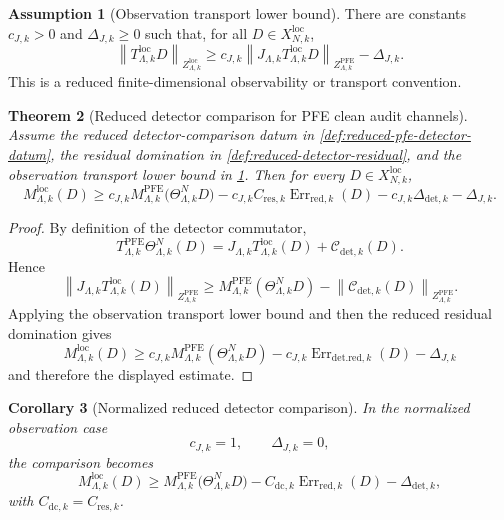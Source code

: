 \documentclass[11pt]{article}
\numberwithin{equation}{section}
\theoremstyle{plain}
\newtheorem{theorem}{Theorem}[section]
\newtheorem{corollary}[theorem]{Corollary}
\theoremstyle{definition}
\newtheorem{assumption}[theorem]{Assumption}
\theoremstyle{remark}
\newcommand{\loc}{\mathrm{loc}}
\newcommand{\norm}[1]{\left\lVert #1\right\rVert}
\begin{document}
\begin{assumption}[Observation transport lower bound]
\label{ass:detector-observation-transport}
There are constants \(c_{J,k}>0\) and \(\Delta_{J,k}\ge0\) such that, for all
\(D\in X_{N,k}^{\loc}\),
\[
  \norm{T_{\Lambda,k}^{\loc}D}_{Z_{\Lambda,k}^{\loc}}
  \ge
  c_{J,k}
  \norm{J_{\Lambda,k}T_{\Lambda,k}^{\loc}D}_{Z_{\Lambda,k}^{\mathrm{PFE}}}
  -
  \Delta_{J,k}.
\]
This is a reduced finite-dimensional observability or transport convention.
\end{assumption}

\begin{theorem}[Reduced detector comparison for PFE clean audit channels]
\label{thm:reduced-pfe-detector-comparison}
Assume the reduced detector-comparison datum in
\cref{def:reduced-pfe-detector-datum}, the residual domination in
\cref{def:reduced-detector-residual}, and the observation transport lower
bound in \cref{ass:detector-observation-transport}.  Then for every
\(D\in X_{N,k}^{\loc}\),
\[
  M_{\Lambda,k}^{\loc}(D)
  \ge
  c_{J,k}
  M_{\Lambda,k}^{\mathrm{PFE}}
  \bigl(\Theta_{\Lambda,k}^{N}D\bigr)
  -
  c_{J,k}C_{\mathrm{res},k}
  \operatorname{Err}_{\mathrm{red},k}(D)
  -
  c_{J,k}\Delta_{\mathrm{det},k}
  -
  \Delta_{J,k}.
\]
\end{theorem}

\begin{proof}
By definition of the detector commutator,
\[
  T_{\Lambda,k}^{\mathrm{PFE}}\Theta_{\Lambda,k}^{N}(D)
  =
  J_{\Lambda,k}T_{\Lambda,k}^{\loc}(D)
  +
  \mathcal C_{\mathrm{det},k}(D).
\]
Hence
\[
  \norm{J_{\Lambda,k}T_{\Lambda,k}^{\loc}(D)}_{Z_{\Lambda,k}^{\mathrm{PFE}}}
  \ge
  M_{\Lambda,k}^{\mathrm{PFE}}(\Theta_{\Lambda,k}^{N}D)
  -
  \norm{\mathcal C_{\mathrm{det},k}(D)}_{Z_{\Lambda,k}^{\mathrm{PFE}}}.
\]
Applying the observation transport lower bound and then the reduced residual
domination gives
\[
  M_{\Lambda,k}^{\loc}(D)
  \ge
  c_{J,k}
  M_{\Lambda,k}^{\mathrm{PFE}}(\Theta_{\Lambda,k}^{N}D)
  -
  c_{J,k}
  \operatorname{Err}_{\mathrm{det.red},k}(D)
  -
  \Delta_{J,k}
\]
and therefore the displayed estimate.
\end{proof}

\begin{corollary}[Normalized reduced detector comparison]
\label{cor:normalized-reduced-detector-comparison}
In the normalized observation case
\[
  c_{J,k}=1,
  \qquad
  \Delta_{J,k}=0,
\]
the comparison becomes
\[
  M_{\Lambda,k}^{\loc}(D)
  \ge
  M_{\Lambda,k}^{\mathrm{PFE}}
  \bigl(\Theta_{\Lambda,k}^{N}D\bigr)
  -
  C_{\mathrm{dc},k}
  \operatorname{Err}_{\mathrm{red},k}(D)
  -
  \Delta_{\mathrm{det},k},
\]
with \(C_{\mathrm{dc},k}=C_{\mathrm{res},k}\).
\end{corollary}
\end{document}
